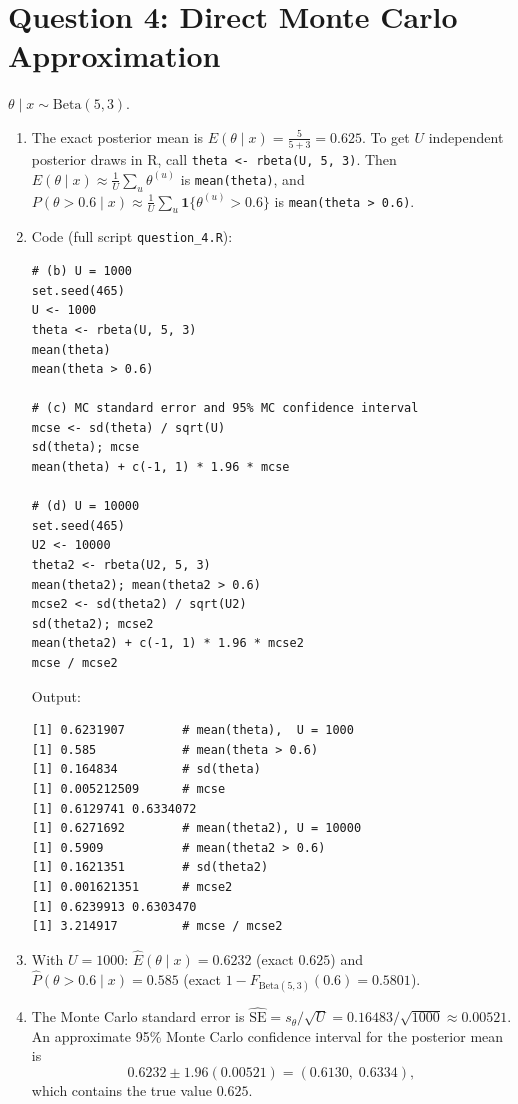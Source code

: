 \documentclass[11pt]{article}
\begin{document}
\section*{Question 4: Direct Monte Carlo Approximation}

$\theta \mid x \sim \text{Beta}(5,3)$.

\begin{enumerate}
\item The exact posterior mean is $E(\theta\mid x) = \frac{5}{5+3} = 0.625$.
To get $U$ independent posterior draws in R, call \texttt{theta <- rbeta(U, 5, 3)}. Then $E(\theta\mid x) \approx \frac{1}{U}\sum_u \theta^{(u)}$ is \texttt{mean(theta)}, and $P(\theta > 0.6\mid x) \approx \frac{1}{U}\sum_u \mathbf{1}\{\theta^{(u)} > 0.6\}$ is \texttt{mean(theta > 0.6)}.

\item[(b)--(d)] Code (full script \texttt{question\_4.R}):
\begin{lstlisting}
# (b) U = 1000
set.seed(465)
U <- 1000
theta <- rbeta(U, 5, 3)
mean(theta)
mean(theta > 0.6)

# (c) MC standard error and 95% MC confidence interval
mcse <- sd(theta) / sqrt(U)
sd(theta); mcse
mean(theta) + c(-1, 1) * 1.96 * mcse

# (d) U = 10000
set.seed(465)
U2 <- 10000
theta2 <- rbeta(U2, 5, 3)
mean(theta2); mean(theta2 > 0.6)
mcse2 <- sd(theta2) / sqrt(U2)
sd(theta2); mcse2
mean(theta2) + c(-1, 1) * 1.96 * mcse2
mcse / mcse2
\end{lstlisting}
Output:
\begin{lstlisting}[style=out]
[1] 0.6231907        # mean(theta),  U = 1000
[1] 0.585            # mean(theta > 0.6)
[1] 0.164834         # sd(theta)
[1] 0.005212509      # mcse
[1] 0.6129741 0.6334072
[1] 0.6271692        # mean(theta2), U = 10000
[1] 0.5909           # mean(theta2 > 0.6)
[1] 0.1621351        # sd(theta2)
[1] 0.001621351      # mcse2
[1] 0.6239913 0.6303470
[1] 3.214917         # mcse / mcse2
\end{lstlisting}

\item[(b)] With $U = 1000$: $\widehat{E}(\theta\mid x) = 0.6232$ (exact $0.625$) and $\widehat{P}(\theta > 0.6\mid x) = 0.585$ (exact $1 - F_{\text{Beta}(5,3)}(0.6) = 0.5801$).

\item[(c)] The Monte Carlo standard error is
$\widehat{\text{SE}} = s_\theta/\sqrt{U} = 0.16483/\sqrt{1000} \approx 0.00521$.
An approximate 95\% Monte Carlo confidence interval for the posterior mean is
\[
0.6232 \pm 1.96(0.00521) = (0.6130,\; 0.6334),
\]
which contains the true value $0.625$.


\end{enumerate}
\end{document}
